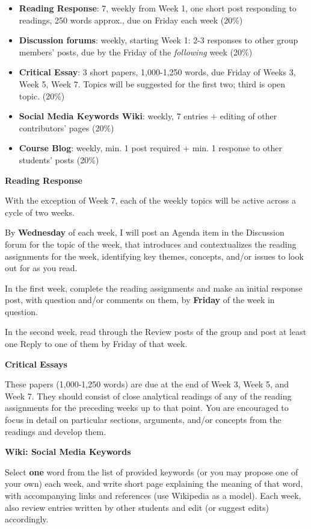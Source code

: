\documentclass[
  letterpaper,
  DIV=11,
  numbers=noendperiod,
  oneside]{scrartcl}
\providecommand{\tightlist}{%
  \setlength{\itemsep}{0pt}\setlength{\parskip}{0pt}}\usepackage{longtable,booktabs,array}
\begin{document}
\begin{itemize}
\tightlist
\item
  \textbf{Reading Response}: 7, weekly from Week 1, one short post
  responding to readings, 250 words approx., due on Friday each week
  (20\%)
\item
  \textbf{Discussion forums}: weekly, starting Week 1: 2-3 responses to
  other group members' posts, due by the Friday of the \emph{following}
  week (20\%)
\item
  \textbf{Critical Essay}: 3 short papers, 1,000-1,250 words, due Friday
  of Weeks 3, Week 5, Week 7. Topics will be suggested for the first
  two; third is open topic. (20\%)
\item
  \textbf{Social Media Keywords Wiki}: weekly, 7 entries + editing of
  other contributors' pages (20\%)
\item
  \textbf{Course Blog}: weekly, min. 1 post required + min. 1 response
  to other students' posts (20\%)
\end{itemize}

\textbf{Reading Response}

With the exception of Week 7, each of the weekly topics will be active
across a cycle of two weeks.

By \textbf{Wednesday} of each week, I will post an Agenda item in the
Discussion forum for the topic of the week, that introduces and
contextualizes the reading assignments for the week, identifying key
themes, concepts, and/or issues to look out for as you read.

In the first week, complete the reading assignments and make an initial
response post, with question and/or comments on them, by \textbf{Friday}
of the week in question.

In the second week, read through the Review posts of the group and post
at least one Reply to one of them by Friday of that week.

\textbf{Critical Essays}

These papers (1,000-1,250 words) are due at the end of Week 3, Week 5,
and Week 7. They should consist of close analytical readings of any of
the reading assignments for the preceding weeks up to that point. You
are encouraged to focus in detail on particular sections, arguments,
and/or concepts from the readings and develop them.

\textbf{Wiki: Social Media Keywords}

Select \textbf{one} word from the list of provided keywords (or you may
propose one of your own) each week, and write short page explaining the
meaning of that word, with accompanying links and references (use
Wikipedia as a model). Each week, also review entries written by other
students and edit (or suggest edits) accordingly.
\end{document}
